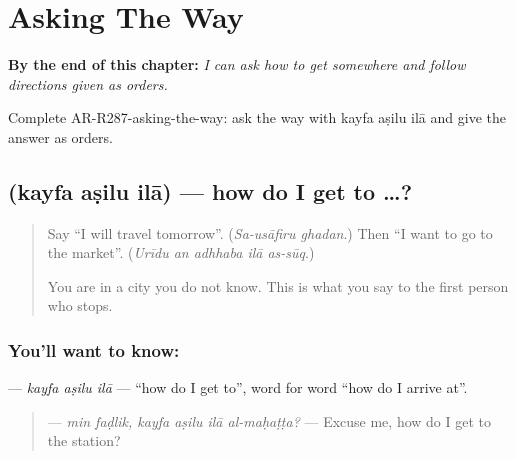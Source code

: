 
\chapter{Asking The Way}
\label{ch:ar-asking-the-way}

\begin{chapteropening}
\textbf{By the end of this chapter:} \emph{I can ask how to get somewhere and follow directions given as orders.}

Complete AR-R287-asking-the-way: ask the way with kayfa aṣilu ilā and give the answer as orders.
\end{chapteropening}

\section[\texorpdfstring{\ar{كيف} \ar{أصل} \ar{إلى} (kayfa aṣilu ilā)}{كيف أصل إلى (kayfa aṣilu ilā)}]{   (kayfa aṣilu ilā) — how do I get to …?}

\label{lesson:AR-C287-kayfa-asilu}



\begin{quote}
Say \textquotedblleft{}I will travel tomorrow\textquotedblright{}. (\emph{Sa-usāfiru ghadan}.) Then \textquotedblleft{}I want to go to the market\textquotedblright{}. (\emph{Urīdu an adhhaba ilā as-sūq}.)

You are in a city you do not know. This is what you say to the first person who stops.
\end{quote}

\subsection*{You'll want to know:   }
\textbf{  } — \emph{kayfa aṣilu ilā} — \textquotedblleft{}how do I get to\textquotedblright{}, word for word \textquotedblleft{}how do I arrive at\textquotedblright{}.

\begin{quote}
\textbf{     } — \emph{min faḍlik, kayfa aṣilu ilā al-maḥaṭṭa?} — Excuse me, how do I get to the station?
\end{quote}

